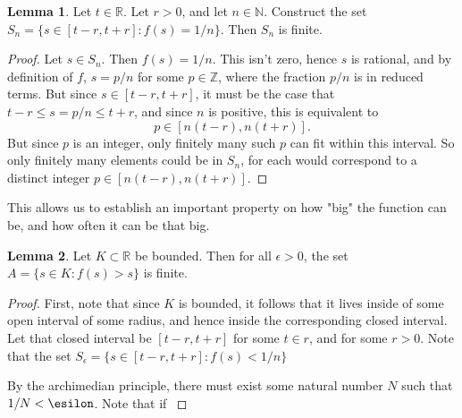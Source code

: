 \documentclass[12pt]{article}
\newcommand{\R}{\mathbb{R}}
\newcommand{\Z}{\mathbb{Z}}
\newcommand{\N}{\mathbb{N}}
\theoremstyle{definition}
\newtheorem{lemma}{Lemma}
\begin{document}
\begin{lemma}
    Let $t\in \R$. Let $r > 0$, and let $ n\in \N $. Construct the set $S_n = \{s\in [t - r, t + r]: f(s) = 1/n\}$. Then $S_n$ is finite.
\end{lemma}

\begin{proof}
    Let $s\in S_n$. Then $ f(s) = 1/n $. This isn't zero, hence $s$ is rational, and by definition of $f$, $s = p/n$ for some $p\in \Z$, where the fraction $p/n$ is in reduced terms. But since $s\in [t - r, t + r]$, it must be the case that $ t - r\le s=p/n\le t + r$, and since $n $ is positive, this is equivalent to 
    \[
        p\in [n(t - r) , n(t + r)].
        \]
    But since $p$ is an integer, only finitely many such $p$ can fit within this interval. So only finitely many elements could be in $S_n$, for each would correspond to a distinct integer $p\in [n(t - r) , n(t + r)]$.
\end{proof}

This allows us to establish an important property on how "big" the function can be, and how often it can be that big. 

\begin{lemma}
    Let $K\subset \R$ be bounded. Then for all $\epsilon > 0$, the set $ A = \{s\in K: f(s) > s\} $ is finite.
\end{lemma}

\begin{proof}
    First, note that since $K$ is bounded, it follows that it lives inside of some open interval of some radius, and hence inside the corresponding closed interval. Let that closed interval be $ [t - r, t + r] $ for some $t\in r$, and for some $r> 0$. Note that the set $ S_\epsilon = \{s\in [t - r, t + r]: f(s) < 1/n\} $

    By the archimedian principle, there must exist some natural number $N$ such that $1/N < \esilon$. Note that if $  $
\end{proof}
\end{document}
